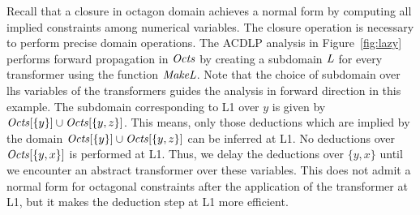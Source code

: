Recall that a closure in octagon domain achieves a normal form by computing all
implied constraints among numerical variables. The closure operation is 
necessary to perform precise domain operations.  The ACDLP analysis in
Figure~\ref{fig:lazy} performs forward propagation in $\mathit{Octs}$ by creating a 
subdomain $\mathit{L}$ for every transformer using the function $\mathit{MakeL}$.  
Note that the choice of subdomain over lhs variables of the transformers guides the 
analysis in forward direction in this example. The subdomain 
corresponding to L1 over $y$ is given by 
$\mathit{Octs}[\{y\}]\cup\mathit{Octs}[\{y,z\}]$.  This means, only those deductions 
which are implied by the domain $\mathit{Octs}[\{y\}]\cup\mathit{Octs}[\{y,z\}]$ can be
inferred at L1.  No deductions over $\mathit{Octs}[\{y,x\}]$ is performed at L1.  
Thus, we delay the deductions over $\{y,x\}$ until we encounter an abstract 
transformer over these variables.  This does not admit a normal form for 
octagonal constraints after the application of the transformer at L1, but it 
makes the deduction step at L1 more efficient.  

